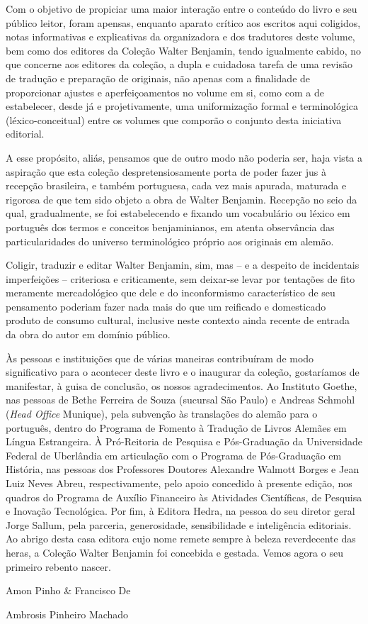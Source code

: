 Com o objetivo de propiciar uma maior interação entre o
conteúdo do livro e seu público leitor, foram apensas, enquanto
aparato crítico aos escritos aqui coligidos, notas informativas e
explicativas da organizadora e dos tradutores deste volume, bem como dos
editores da Coleção Walter Benjamin, tendo igualmente cabido, no que
concerne aos editores da coleção, a dupla e cuidadosa tarefa de uma
revisão de tradução e preparação de originais, não apenas com a
finalidade de proporcionar ajustes e aperfeiçoamentos no volume em si,
como com a de estabelecer, desde já e projetivamente, uma uniformização
formal e terminológica (léxico-conceitual) entre os volumes que comporão
o conjunto desta iniciativa editorial.

A esse propósito, aliás, pensamos que de outro modo não poderia ser,
haja vista a aspiração que esta coleção despretensiosamente porta de
poder fazer jus à recepção brasileira, e também portuguesa, cada vez
mais apurada, maturada e rigorosa de que tem sido objeto a obra de
Walter Benjamin. Recepção no seio da qual, gradualmente, se foi
estabelecendo e fixando um vocabulário ou léxico em português dos termos
e conceitos benjaminianos, em atenta observância das particularidades do
universo terminológico próprio aos originais em alemão.

Coligir, traduzir e editar Walter Benjamin, sim, mas -- e a despeito de
incidentais imperfeições -- criteriosa e criticamente, sem deixar-se
levar por tentações de fito meramente mercadológico que dele e do
inconformismo característico de seu pensamento poderiam fazer nada mais
do que um reificado e domesticado produto de consumo cultural, inclusive
neste contexto ainda recente de entrada da obra do autor em domínio
público.

Às pessoas e instituições que de várias maneiras contribuíram de modo
significativo para o acontecer deste livro e o inaugurar da coleção,
gostaríamos de manifestar, à guisa de conclusão, os nossos
agradecimentos. Ao Instituto Goethe, nas pessoas de Bethe Ferreira de
Souza (sucursal São Paulo) e Andreas Schmohl (\emph{Head Office}
Munique), pela subvenção às translações do alemão para o português,
dentro do Programa de Fomento à Tradução de Livros Alemães em Língua
Estrangeira. À Pró-Reitoria de Pesquisa e Pós-Graduação da Universidade
Federal de Uberlândia em articulação com o Programa de Pós-Graduação em
História, nas pessoas dos Professores Doutores Alexandre Walmott Borges
e Jean Luiz Neves Abreu, respectivamente, pelo apoio concedido à
presente edição, nos quadros do Programa de Auxílio Financeiro às
Atividades Científicas, de Pesquisa e Inovação Tecnológica. Por fim, à
Editora Hedra, na pessoa do seu diretor geral Jorge Sallum, pela
parceria, generosidade, sensibilidade e inteligência editoriais. Ao
abrigo desta casa editora cujo nome remete sempre à beleza reverdecente
das heras, a Coleção Walter Benjamin foi concebida e gestada. Vemos
agora o seu primeiro rebento nascer.

{\smallskip\small\itshape\hfill {Amon Pinho \& Francisco De\par
\hfill        Ambrosis Pinheiro Machado}}\medskip



